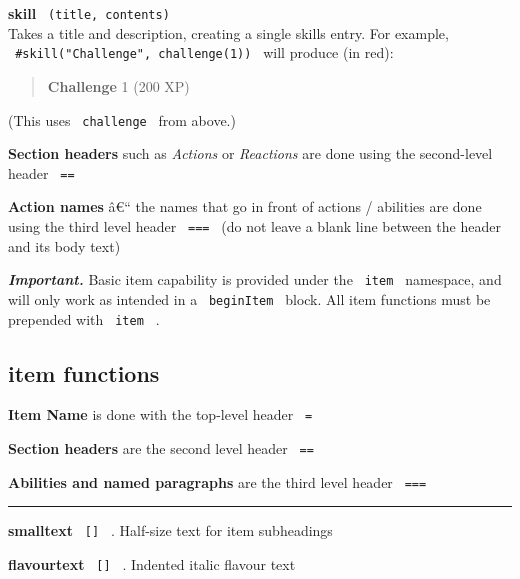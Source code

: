 \textbf{skill} \texttt{\ (title,\ contents)\ }\\
Takes a title and description, creating a single skills entry. For
example, \texttt{\ \#skill("Challenge",\ challenge(1))\ } will produce
(in red):

\begin{quote}
\textbf{Challenge} 1 (200 XP)
\end{quote}

(This uses \texttt{\ challenge\ } from above.)

\textbf{Section headers} such as \emph{Actions} or \emph{Reactions} are
done using the second-level header \texttt{\ ==\ }

\textbf{Action names} â€`` the names that go in front of actions /
abilities are done using the third level header \texttt{\ ===\ } (do not
leave a blank line between the header and its body text)

\emph{\textbf{Important.}} Basic item capability is provided under the
\texttt{\ item\ } namespace, and will only work as intended in a
\texttt{\ beginItem\ } block. All item functions must be prepended with
\texttt{\ item\ } .

\subsection{item functions}\label{item-functions}

\textbf{Item Name} is done with the top-level header \texttt{\ =\ }

\textbf{Section headers} are the second level header \texttt{\ ==\ }

\textbf{Abilities and named paragraphs} are the third level header
\texttt{\ ===\ }

\begin{center}\rule{0.5\linewidth}{0.5pt}\end{center}

\textbf{smalltext} \texttt{\ {[}{]}\ } . Half-size text for item
subheadings

\textbf{flavourtext} \texttt{\ {[}{]}\ } . Indented italic flavour text


